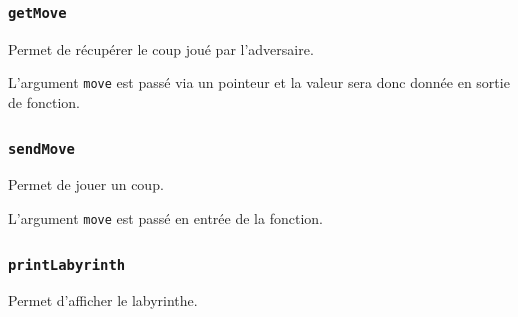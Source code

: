 \documentclass[french,12pt,a4paper,twoside,openright,titlepage]{report}
\begin{document}
\subsubsection{\texttt{getMove}}
Permet de récupérer le coup joué par l'adversaire.

L'argument \texttt{move} est passé via un pointeur et 
la valeur sera donc donnée en sortie de fonction.


\subsubsection{\texttt{sendMove}}
Permet de jouer un coup.

L'argument \texttt{move} est passé en entrée de la fonction.

\subsubsection{\texttt{printLabyrinth}}
Permet d'afficher le labyrinthe.

\end{document}
